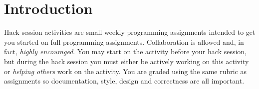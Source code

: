 \section*{Introduction}

Hack session activities are small weekly programming assignments intended
to get you started on full programming assignments.  Collaboration is allowed
and, in fact, \emph{highly encouraged}.  You may start on the activity before
your hack session, but during the hack session you must either be actively 
working on this activity or \emph{helping others} work on the activity.
You are graded using the same rubric as assignments so documentation, style, 
design and correctness are all important.


